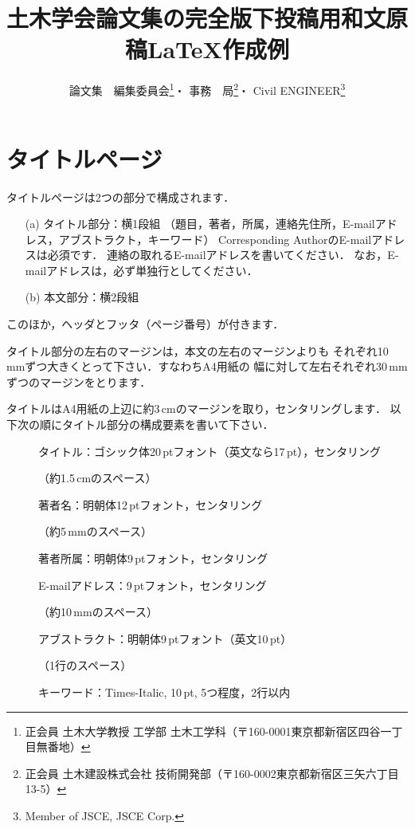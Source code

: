 \documentclass[dvipdfmx]{jsce}
\title{土木学会論文集の完全版下投稿用和文原稿\LaTeX 作成例}
\author{論文集　編集委員会\thanks{正会員 土木大学教授 工学部 土木工学科（〒160-0001東京都新宿区四谷一丁目無番地）\email{your_name@foo.ac.jp}}・
        事務　局\thanks{正会員 土木建設株式会社 技術開発部（〒160-0002東京都新宿区三矢六丁目13-5）\email{author2@foo.ac.jp} \correspo}・
        Civil ENGINEER\thanks{Member of JSCE, JSCE Corp. \email{author3@foo.ac.jp}}
        }
\begin{document}
\maketitle

\section{タイトルページ}

タイトルページは2つの部分で構成されます．
\begin{enumerate}
\setlength{\leftskip}{1em}
\setlength{\itemsep}{1ex}
\item[(a)] タイトル部分：横1段組
         （題目，著者，所属，連絡先住所，E-mailアドレス，アブストラクト，キーワード）
          Corresponding AuthorのE-mailアドレスは必須です．
          連絡の取れるE-mailアドレスを書いてください．
          なお，E-mailアドレスは，必ず単独行としてください．\par
\item[(b)] 本文部分：横2段組
\end{enumerate}
\par
このほか，ヘッダとフッタ（ページ番号）が付きます．

タイトル部分の左右のマージンは，本文の左右のマージンよりも
それぞれ10\,mmずつ大きくとって下さい．すなわちA4用紙の
幅に対して左右それぞれ30\,mmずつのマージンをとります．

タイトルはA4用紙の上辺に約3\,cmのマージンを取り，センタリングします．
以下次の順にタイトル部分の構成要素を書いて下さい．
\begin{description}
\item[] タイトル：ゴシック体20\,ptフォント（英文なら17\,pt），センタリング\par
        （約1.5\,cmのスペース）
\item[] 著者名：明朝体12\,ptフォント，センタリング\par
        （約5\,mmのスペース）
\item[] 著者所属：明朝体9\,ptフォント，センタリング\par
\item[] E-mailアドレス：9\,ptフォント，センタリング\par
        （約10\,mmのスペース）
\item[] アブストラクト：明朝体9\,ptフォント（英文10\,pt）\par
        （1行のスペース）
\item[] キーワード：Times-Italic, 10\,pt, 5つ程度，2行以内
\end{description}
\end{document}
